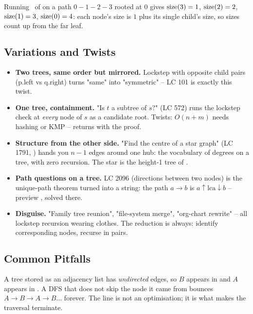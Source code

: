 \begin{tracebox}
Running \lstname\ of  on a path $0-1-2-3$ rooted at $0$ gives
$\operatorname{size}(3)=1$, $\operatorname{size}(2)=2$, $\operatorname{size}(1)=3$, $\operatorname{size}(0)=4$: each node's size is $1$ plus its
single child's size, so sizes count up from the far leaf.
\end{tracebox}

\subsection{Variations and Twists}

\begin{itemize}
  \item \textbf{Two trees, same order but mirrored.} Lockstep with opposite child pairs
        (p.left vs q.right) turns "same" into "symmetric" -- LC 101 is exactly this twist.
        \hfill{}
  \item \textbf{One tree, containment.} "Is $t$ a subtree of $s$?" (LC 572) runs the
        lockstep check at \emph{every} node of $s$ as a candidate root. Twists:
        $O(n+m)$ needs hashing or KMP --  returns with the proof.
        \hfill{}
  \item \textbf{Structure from the other side.} "Find the centre of a star graph"
        (LC 1791, ) hands you $n-1$ edges around one hub: the vocabulary of
        degrees on a tree, with zero recursion. The star is the height-1 tree of
        .
  \item \textbf{Path questions on a tree.} LC 2096 (directions between two nodes) is
        the unique-path theorem turned into a string: the path $a\to b$ is
        $a{\uparrow}\mathrm{lca}{\downarrow}b$ -- preview , solved there.
        \hfill{}
  \item \textbf{Disguise.} "Family tree reunion", "file-system merge", "org-chart
        rewrite" -- all lockstep recursion wearing clothes. The reduction is always:
        identify corresponding nodes, recurse in pairs.
\end{itemize}

\subsection{Common Pitfalls}

\begin{warningbox}
A tree stored as an adjacency list has \emph{undirected} edges, so $B$ appears in
 and $A$ appears in . A DFS that does not skip the node it came
from bounces $A\to B\to A\to B\ldots$ forever. The line  is
not an optimisation; it is what makes the traversal terminate.
\end{warningbox}

